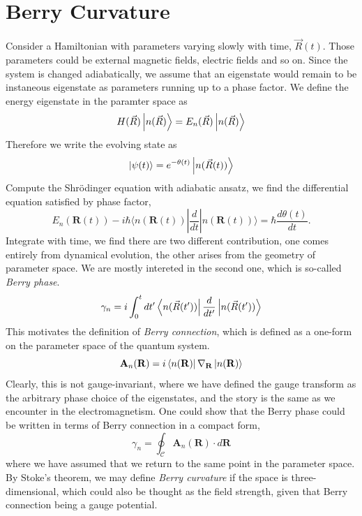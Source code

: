 \documentclass[12pt,a4paper]{article}
\numberwithin{equation}{section}
\begin{document}
\section{Berry Curvature}
Consider a Hamiltonian with parameters varying slowly with time, $\vec{R}(t)$. Those parameters could be external magnetic fields, electric fields and so on.
Since the system is changed adiabatically, we assume that an eigenstate would remain to be instaneous eigenstate as parameters running up to a phase factor. We define the energy eigenstate in the paramter space as
\begin{equation}
    H(\vec{R})\ket{n(\vec{R})} = E_n(\vec{R})\ket{n(\vec{R})}
\end{equation}
Therefore we write the evolving state as
\begin{equation}
    \ket{\psi(t)} = e^{-\theta(t)}\ket{n(\vec{R}(t))}
\end{equation}
Compute the Shrödinger equation with adiabatic ansatz, we find the differential equation satisfied by phase factor,
\begin{equation}
    E_n(\mathbf{R}(t))-i \hbar\langle n(\mathbf{R}(t))| \frac{d}{d t}|n(\mathbf{R}(t))\rangle=\hbar \frac{d \theta(t)}{d t} .
\end{equation}
Integrate with time, we find there are two different contribution, one comes entirely from dynamical evolution, the other arises
from the geometry of parameter space. We are mostly intereted in the second one, which is so-called \textit{Berry phase}.
\begin{equation}
    \gamma_n = i\int_0^t dt' \bra{n(\vec{R}(t'))}\frac{d}{dt'}\ket{n(\vec{R}(t'))}
\end{equation}
This motivates the definition of \textit{Berry connection}, which is defined as a one-form on the parameter space of the quantum system.
\begin{equation}
    \mathbf{A}_n(\mathbf{R}) = i\bra{n(\mathbf{R})}\nabla_{\mathbf{R}}\ket{n(\mathbf{R})}
\end{equation}
Clearly, this is not gauge-invariant, where we have defined the gauge transform as the arbitrary phase choice of the eigenstates, and the story is the same as we encounter in the electromagnetism.
One could show that the Berry phase could be written in terms of Berry connection in a compact form,
\begin{equation}
    \gamma_n = \oint_{\mathcal{C}} \mathbf{A}_n(\mathbf{R})\cdot d\mathbf{R}
\end{equation}
where we have assumed that we return to the same point in the parameter space. By Stoke's theorem, we may define \textit{Berry curvature} if the space is three-dimensional,
which could also be thought as the field strength, given that Berry connection being a gauge potential. 
\end{document}
